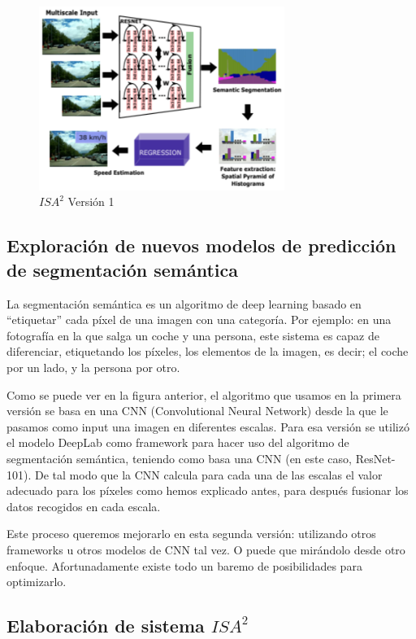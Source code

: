 \documentclass[12pt,oneside,a4paper]{article}
\begin{document}
\begin{figure}[h]
  \centering
  \includegraphics[width=8cm]{figuras/Figura_Esquema_ISA2_Version_1_SegSem.eps}
  \caption{$ISA^2$ Versión 1}
\end{figure}

\subsection{Exploración de nuevos modelos de predicción de segmentación semántica}

La segmentación semántica es un algoritmo de deep learning basado en ``etiquetar'' cada píxel de una imagen con una categoría. Por ejemplo: en una fotografía en la que salga un coche y una persona, este sistema es capaz de diferenciar, etiquetando los píxeles, los elementos de la imagen, es decir; el coche por un lado, y la persona por otro.

Como se puede ver en la figura anterior, el algoritmo que usamos en la primera versión se basa en una CNN (Convolutional Neural Network) desde la que le pasamos como input una imagen en diferentes escalas. Para esa versión se utilizó el modelo DeepLab como framework para hacer uso del algoritmo de segmentación semántica, teniendo como basa una CNN (en este caso, ResNet-101). De tal modo que la CNN calcula para cada una de las escalas el valor adecuado para los píxeles como hemos explicado antes, para después fusionar los datos recogidos en cada escala.

Este proceso queremos mejorarlo en esta segunda versión: utilizando otros frameworks u otros modelos de CNN tal vez. O puede que mirándolo desde otro enfoque. Afortunadamente existe todo un baremo de posibilidades para optimizarlo. 
\subsection{Elaboración de sistema $ISA^2$}
\end{document}
